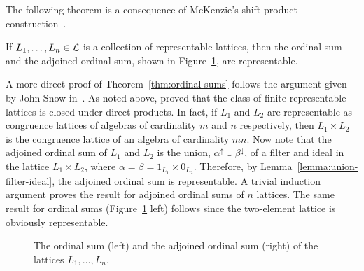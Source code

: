 The following theorem is a consequence of 
McKenzie's shift product construction~\cite{McKenzie:1984}. 
\begin{theorem}
  \label{thm:ordinal-sums}
  If $L_1, \dots, L_n \in \mathcal{L}$ is a collection of representable lattices, then
  the ordinal sum and the adjoined ordinal sum, shown in
  Figure~\ref{fig:ord_adjord}, are representable.
\end{theorem}
A more direct proof of Theorem~\ref{thm:ordinal-sums} follows the argument given
by John Snow in~\cite{Snow:2000}.  As noted above, 
\Jiri \Tuma proved that
the class of finite representable lattices is closed under direct products.
In fact, if $L_1$ and 
$L_2$ are representable as congruence lattices of algebras of cardinality $m$ and $n$ respectively, then $L_1 \times L_2$ is the congruence lattice of an algebra of
cardinality $mn$. Now note that the
adjoined ordinal sum of $L_1$ and $L_2$ is the union, $\alpha^\uparrow \cup
\beta^\downarrow$,  of a filter and ideal  
in the lattice $L_1 \times L_2$, where
$\alpha = \beta = 1_{L_1} \times 0_{L_2}$.  
Therefore, by Lemma~\ref{lemma:union-filter-ideal},
the adjoined ordinal sum is representable.  A trivial induction argument proves the
result for adjoined ordinal sums of $n$ lattices.  The same result for ordinal
sums (Figure~\ref{fig:ord_adjord} left) follows since the two-element lattice is
obviously representable. 

\begin{center}
  \begin{figure}[h!]
    \label{fig:ord_adjord}
    \centering
        {
          \hskip1cm
        }
        \caption{The ordinal sum (left) and the adjoined ordinal sum (right) of
          the lattices $L_1, \dots, L_n$.}
  \end{figure}
\end{center}

